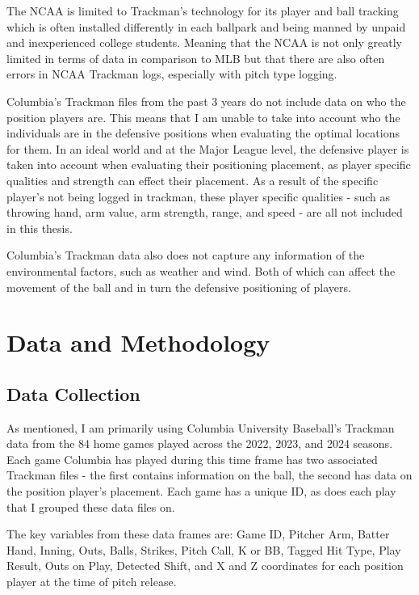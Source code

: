 \documentclass{article}
\begin{document}
The NCAA is limited to Trackman's technology for its player and ball tracking which is often installed differently in each ballpark and being manned by unpaid and inexperienced college students. Meaning that the NCAA is not only greatly limited in terms of data in comparison to MLB but that there are also often errors in NCAA Trackman logs, especially with pitch type logging. 

Columbia's Trackman files from the past 3 years do not include data on who the position players are. This means that I am unable to take into account who the individuals are in the defensive positions when evaluating the optimal locations for them. In an ideal world and at the Major League level, the defensive player is taken into account when evaluating their positioning placement, as player specific qualities and strength can effect their placement.  As a result of the specific player's not being logged in trackman, these player specific qualities - such as throwing hand, arm value, arm strength, range, and speed  - are all not included in this thesis. 

Columbia's Trackman data also does not capture any information of the environmental factors, such as weather and wind. Both of which can affect the movement of the ball and in turn the defensive positioning of players. 

\newpage
\section{Data and Methodology}

\subsection{Data Collection}

As mentioned, I am primarily using Columbia University Baseball's Trackman data from the 84 home games played across the 2022, 2023, and 2024 seasons. Each game Columbia has played during this time frame has two associated Trackman files - the first contains information on the ball, the second has data on the position player's placement. Each game has a unique ID, as does each play that I grouped these data files on. 

The key variables from these data frames are: Game ID, Pitcher Arm, Batter Hand, Inning, Outs, Balls, Strikes, Pitch Call, K or BB, Tagged Hit Type, Play Result, Outs on Play, Detected Shift, and X and Z coordinates for each position player at the time of pitch release. 
\end{document}
